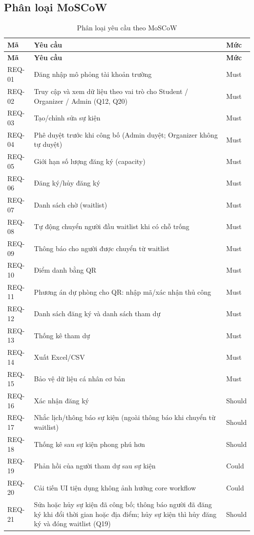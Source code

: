 \subsection*{Phân loại MoSCoW}
\begingroup\tblsetup\tblzebra
\begin{longtable}{L{1.8cm}L{10.2cm}L{1.8cm}}
\caption{Phân loại yêu cầu theo MoSCoW}\label{tab:moscow}\\
\toprule
{}\textbf{Mã} & \textbf{Yêu cầu} & \textbf{Mức} \\
\midrule
\endfirsthead
\toprule
{}\textbf{Mã} & \textbf{Yêu cầu} & \textbf{Mức} \\
\midrule
\endhead
\bottomrule
\endlastfoot
REQ-01 & Đăng nhập mô phỏng tài khoản trường & Must \\
REQ-02 & Truy cập và xem dữ liệu theo vai trò cho Student / Organizer / Admin (Q12, Q20) & Must \\
REQ-03 & Tạo/chỉnh sửa sự kiện & Must \\
REQ-04 & Phê duyệt trước khi công bố (Admin duyệt; Organizer không tự duyệt) & Must \\
REQ-05 & Giới hạn số lượng đăng ký (capacity) & Must \\
REQ-06 & Đăng ký/hủy đăng ký & Must \\
REQ-07 & Danh sách chờ (waitlist) & Must \\
REQ-08 & Tự động chuyển người đầu waitlist khi có chỗ trống & Must \\
REQ-09 & Thông báo cho người được chuyển từ waitlist & Must \\
REQ-10 & Điểm danh bằng QR & Must \\
REQ-11 & Phương án dự phòng cho QR: nhập mã/xác nhận thủ công & Must \\
REQ-12 & Danh sách đăng ký và danh sách tham dự & Must \\
REQ-13 & Thống kê tham dự & Must \\
REQ-14 & Xuất Excel/CSV & Must \\
REQ-15 & Bảo vệ dữ liệu cá nhân cơ bản & Must \\
REQ-16 & Xác nhận đăng ký & Should \\
REQ-17 & Nhắc lịch/thông báo sự kiện (ngoài thông báo khi chuyển từ waitlist) & Should \\
REQ-18 & Thống kê sau sự kiện phong phú hơn & Should \\
REQ-19 & Phản hồi của người tham dự sau sự kiện & Could \\
REQ-20 & Cải tiến UI tiện dụng không ảnh hưởng core workflow & Could \\
REQ-21 & Sửa hoặc hủy sự kiện đã công bố; thông báo người đã đăng ký khi đổi thời gian hoặc địa điểm; hủy sự kiện thì hủy đăng ký và đóng waitlist (Q19) & Should \\
\end{longtable}
\endgroup

